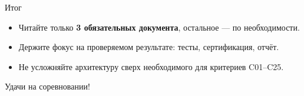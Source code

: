 \documentclass[aspectratio=169]{beamer}
\begin{document}
\begin{frame}{Итог}
  \begin{itemize}
    \item Читайте только \textbf{3 обязательных документа}, остальное --- по необходимости.
    \item Держите фокус на проверяемом результате: тесты, сертификация, отчёт.
    \item Не усложняйте архитектуру сверх необходимого для критериев C01--C25.
  \end{itemize}
  \vspace{0.8em}
  \centering\large Удачи на соревновании!
\end{frame}
\end{document}
